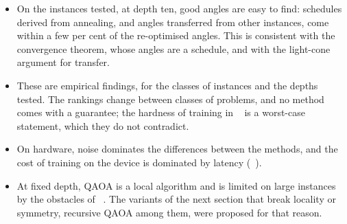 \documentclass[handoutsbeamer.tex]{subfiles}
\begin{document}
\begin{frame}
\end{frame}

\begin{frame}
\onp{\footnotesize}
\begin{itemize}\setlength\itemsep{0.3em}
    \item On the instances tested, at depth ten, good angles are easy to find: schedules derived from annealing, and angles transferred from other instances, come within a few per cent of the re-optimised angles. This is consistent with the convergence theorem, whose angles are a schedule, and with the light-cone argument for transfer.
    \item These are empirical findings, for the classes of instances and the depths tested. The rankings change between classes of problems, and no method comes with a guarantee; the hardness of training in \Chap~ is a worst-case statement, which they do not contradict.
    \item On hardware, noise dominates the differences between the methods, and the cost of training on the device is dominated by latency (\Chap~).
    \item At fixed depth, QAOA is a local algorithm and is limited on large instances by the obstacles of \Chap~. The variants of the next section that break locality or symmetry, recursive QAOA among them, were proposed for that reason.
\end{itemize}
\end{frame}
\end{document}
